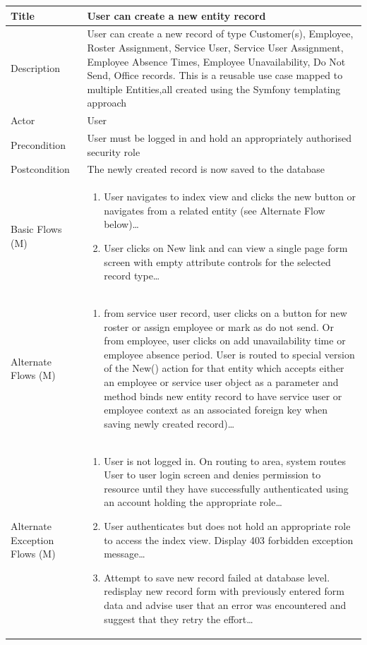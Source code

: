 \documentclass[a4paper,12pt]{article}
\newcommand\addrow[2]{#1 &#2\\ }
\newcommand\addheading[2]{#1 &#2\\ \hline}
\newcommand\tabularhead{\begin{tabular}{lp{11cm}}
\hline
}
\newcommand\addmulrow[2]{ \begin{minipage}[t][][t]{3cm}#1\end{minipage}%
   &\begin{minipage}[t][][t]{11cm}
    \begin{enumerate} #2   \end{enumerate}
    \end{minipage}\\ }
\newenvironment{usecase}{\tabularhead}
{\hline\end{tabular}}
\begin{document}
\begin{samepage}
\begin{usecase}
    \addheading{Title}{User can create a new entity record }
  \addheading{Description}{User can create a new record of type Customer(s), Employee, Roster Assignment, Service User, Service User Assignment, Employee Absence Times, Employee Unavailability, Do Not Send, Office records. This is a reusable use case mapped to multiple Entities,all created using the Symfony templating approach}
  \addheading{Actor}{User} 
  \addrow{Precondition}{User must be logged in and hold an appropriately authorised security role}
  \addrow{Postcondition}{The newly created record is now saved to the database}
  \addmulrow{Basic Flows (M)}{\item User navigates to index view and clicks the new button or navigates from a related entity (see Alternate Flow below)\ldots
                                  \item User clicks on New link and can view a single page form screen with empty attribute controls for the selected record type\ldots}
  \addmulrow{Alternate  Flows (M)}{\item from service user record, user clicks on a button for new roster or assign employee or mark as do not send. Or from employee, user clicks on add unavailability time or employee absence period. User is routed to special version of the New() action for that entity which accepts either an employee or service user object as a parameter and method binds new entity record to have service user or employee context as an associated foreign key when saving newly created record)\ldots}
  \addmulrow{Alternate Exception Flows (M)}{\item User is not logged in. On routing to area, system routes User to user login screen and denies permission to resource until they have successfully authenticated using an account holding the appropriate role\ldots
                                                                      \item User authenticates but does not hold an appropriate role to access the index view. Display 403 forbidden exception message\ldots
                                                                      \item Attempt to save new record failed at database level. redisplay new record form with previously entered form data and advise user that an error was encountered and suggest that they retry the effort\ldots}

\end{usecase}


\end{samepage}
\end{document}
